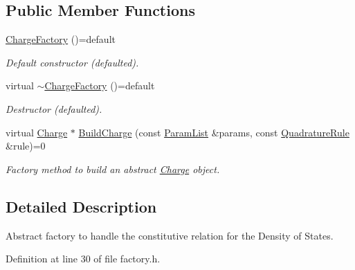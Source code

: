 \subsection*{Public Member Functions}
\begin{DoxyCompactItemize}
\item 
\hypertarget{classChargeFactory_ac9cd065aedc271933d5d9ee8f82bc76b}{\hyperlink{classChargeFactory_ac9cd065aedc271933d5d9ee8f82bc76b}{Charge\-Factory} ()=default}\label{classChargeFactory_ac9cd065aedc271933d5d9ee8f82bc76b}

\begin{DoxyCompactList}\small\item\em Default constructor (defaulted). \end{DoxyCompactList}\item 
\hypertarget{classChargeFactory_a311f54993f661651542b1fb5cec17692}{virtual \hyperlink{classChargeFactory_a311f54993f661651542b1fb5cec17692}{$\sim$\-Charge\-Factory} ()=default}\label{classChargeFactory_a311f54993f661651542b1fb5cec17692}

\begin{DoxyCompactList}\small\item\em Destructor (defaulted). \end{DoxyCompactList}\item 
virtual \hyperlink{classCharge}{Charge} $\ast$ \hyperlink{classChargeFactory_ad4b190a88028e2e195fc5c5a4cfdcf70}{Build\-Charge} (const \hyperlink{classParamList}{Param\-List} \&params, const \hyperlink{classQuadratureRule}{Quadrature\-Rule} \&rule)=0
\begin{DoxyCompactList}\small\item\em Factory method to build an abstract \hyperlink{classCharge}{Charge} object. \end{DoxyCompactList}\end{DoxyCompactItemize}


\subsection{Detailed Description}
Abstract factory to handle the constitutive relation for the Density of States. 

Definition at line 30 of file factory.\-h.



